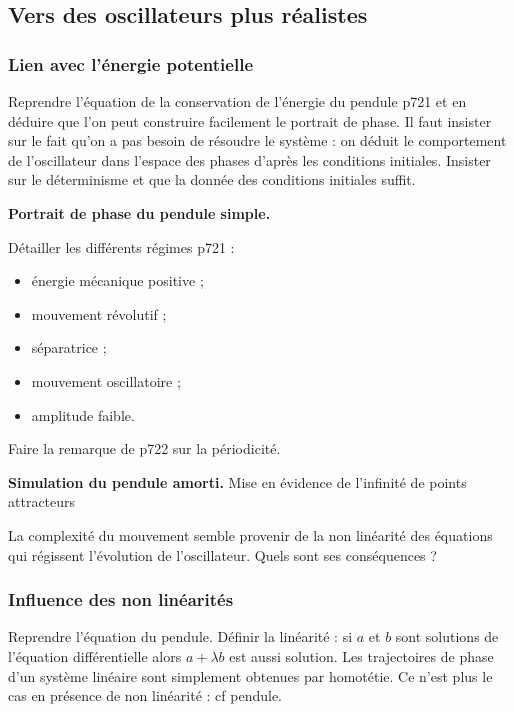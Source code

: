 \subsection{Vers des oscillateurs plus réalistes}

\subsubsection{Lien avec l'énergie potentielle}

Reprendre l'équation de la conservation de l'énergie du pendule \cite{Gie1992} p721 et en déduire que l'on peut construire facilement le portrait de phase.
Il faut insister sur le fait qu'on a pas besoin de résoudre le système : on déduit le comportement de l'oscillateur dans l'espace des phases d'après les conditions initiales. 
Insister sur le déterminisme et que la donnée des conditions initiales suffit.

\begin{slide}
\textbf{Portrait de phase du pendule simple.}
\end{slide}

Détailler les différents régimes \cite{Gie1992} p721 :
\begin{itemize}
\item énergie mécanique positive ;
\item mouvement révolutif ;
\item séparatrice ;
\item mouvement oscillatoire ;
\item amplitude faible.
\end{itemize}
Faire la remarque de \cite{Gie1992} p722 sur la périodicité.

\begin{experience}
\textbf{Simulation du pendule amorti.}
Mise en évidence de l'infinité de points attracteurs
\end{experience}

\begin{transition}
La complexité du mouvement semble provenir de la non linéarité des équations qui régissent l'évolution de l'oscillateur.
Quels sont ses conséquences ?
\end{transition}

\subsubsection{Influence des non linéarités}

Reprendre l'équation du pendule.
Définir la linéarité : si $a$ et $b$ sont solutions de l'équation différentielle alors $a+\lambda b$ est aussi solution.
Les trajectoires de phase d'un système linéaire sont simplement obtenues par homotétie.
Ce n'est plus le cas en présence de non linéarité : cf pendule.

